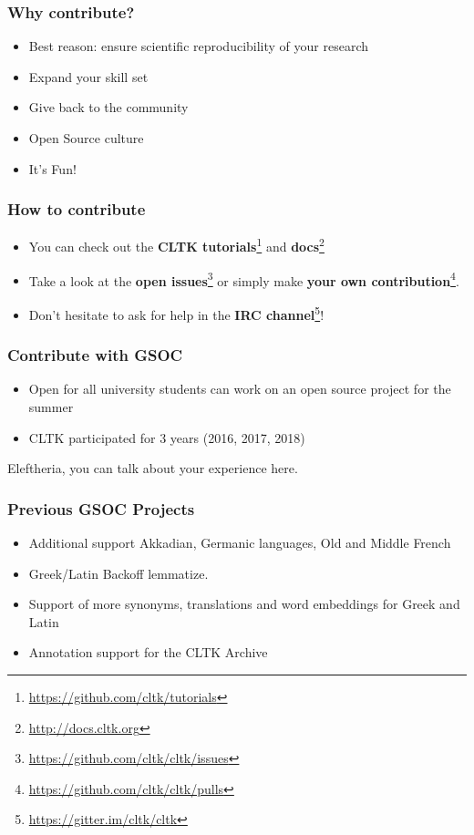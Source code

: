 \documentclass{beamer}
\begin{document}
\begin{frame}
\frametitle{Why contribute?}
\begin{itemize}
    \item Best reason: ensure scientific reproducibility of your research
    \item Expand your skill set
    \item Give back to the community
    \item Open Source culture
    \item It’s Fun!
\end{itemize}
\end{frame}




\begin{frame}
\frametitle{How to contribute}
\begin{itemize}
    \item You can check out the \textbf{CLTK tutorials}\footnote{\href{https://github.com/cltk/tutorials}{https://github.com/cltk/tutorials}} and \textbf{docs}\footnote{\href{http://docs.cltk.org}{http://docs.cltk.org}}
    \item Take a look at the \textbf{open issues}\footnote{\href{https://github.com/cltk/cltk/issues}{https://github.com/cltk/cltk/issues}} or simply make \textbf{your own contribution}\footnote{\href{https://github.com/cltk/cltk/pulls}{https://github.com/cltk/cltk/pulls}}.
    \item Don’t hesitate to ask for help in the \textbf{IRC channel}\footnote{\href{https://gitter.im/cltk/cltk}{https://gitter.im/cltk/cltk}}!
\end{itemize}
\end{frame}

\begin{frame}
\frametitle{Contribute with GSOC}
\begin{itemize}
    \item Open for all university students
    \itemYou can work on an open source project for the summer
    \item CLTK participated for 3 years (2016, 2017, 2018)
\end{itemize}
Eleftheria, you can talk about your experience here.
\end{frame}

\begin{frame}
\frametitle{Previous GSOC Projects}
\begin{itemize}
    \item Additional support Akkadian, Germanic languages, Old and Middle French
    \item Greek/Latin Backoff lemmatize.
    \item Support of more synonyms, translations and word embeddings for Greek and Latin
    \item Annotation support for the CLTK Archive
\end{itemize}
\end{frame}
\end{document}

